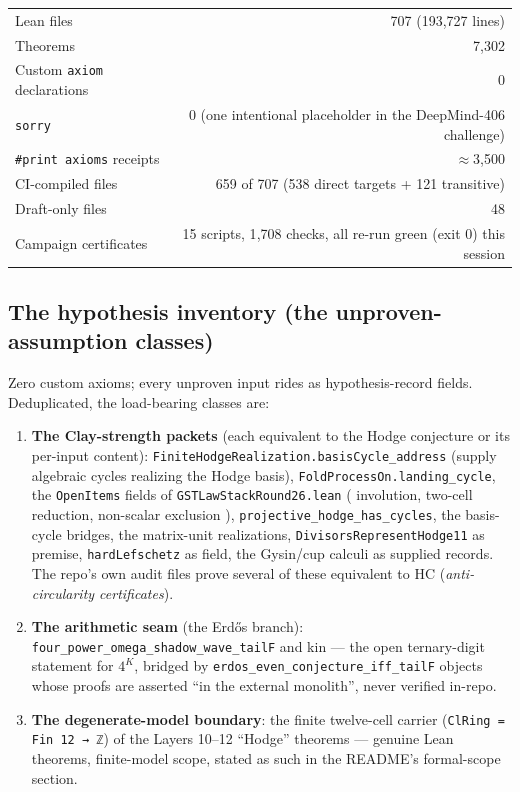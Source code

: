 \documentclass[11pt]{article}
\begin{document}
\begin{center}
\begin{tabular}{@{}lr@{}}
\toprule
Lean files & 707 (193{,}727 lines) \\
Theorems & 7{,}302 \\
Custom \texttt{axiom} declarations & 0 \\
\texttt{sorry} & 0 (one intentional placeholder in the DeepMind-406 challenge) \\
\texttt{\#print axioms} receipts & $\approx$3{,}500 \\
CI-compiled files & 659 of 707 (538 direct targets + 121 transitive) \\
Draft-only files & 48 \\
Campaign certificates & 15 scripts, 1{,}708 checks, all re-run green (exit 0) this session \\
\bottomrule
\end{tabular}
\end{center}

\subsection{The hypothesis inventory (the unproven-assumption classes)}

Zero custom axioms; every unproven input rides as hypothesis-record
fields. Deduplicated, the load-bearing classes are:

\begin{enumerate}
\item \textbf{The Clay-strength packets} (each equivalent to the Hodge
conjecture or its per-input content):
\texttt{FiniteHodgeRealization.}\texttt{basisCycle\_address} (supply
algebraic cycles realizing the Hodge basis),
\texttt{FoldProcessOn.landing\_cycle}, the \texttt{OpenItems} fields of
\texttt{GSTLawStackRound26.lean} ( involution, two-cell reduction,
non-scalar exclusion ), \texttt{projective\_hodge\_has\_cycles}, the
basis-cycle bridges, the matrix-unit realizations,
\texttt{DivisorsRepresentHodge11} as premise, \texttt{hardLefschetz} as
field, the Gysin/cup calculi as supplied records. The repo's own audit
files prove several of these equivalent to $\mathrm{HC}$
(\emph{anti-circularity certificates}).
\item \textbf{The arithmetic seam} (the Erdős branch):
\texttt{four\_power\_omega\_shadow\_wave\_tailF} and kin --- the open
ternary-digit statement for $4^K$, bridged by
\texttt{erdos\_even\_conjecture\_iff\_tailF} objects whose proofs are
asserted ``in the external monolith'', never verified in-repo.
\item \textbf{The degenerate-model boundary}: the finite twelve-cell
carrier (\texttt{ClRing = Fin 12 → ℤ}) of the Layers 10--12 ``Hodge''
theorems --- genuine Lean theorems, finite-model scope, stated as such in
the README's formal-scope section.
\end{enumerate}
\end{document}
